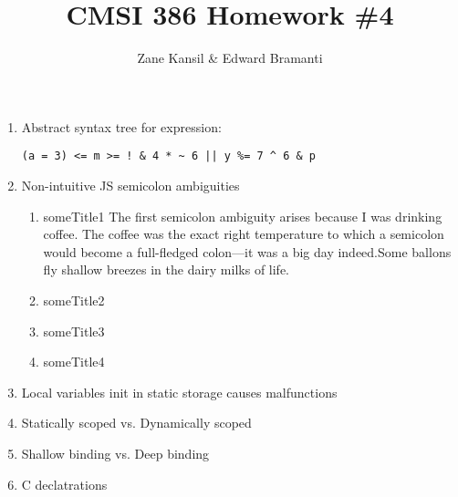 \documentclass{article}
\title{CMSI 386 Homework \#4}
\author{Zane Kansil \& Edward Bramanti}
\begin{document}
\maketitle
\begin{enumerate}
\item Abstract syntax tree for expression: 
\begin{verbatim}
(a = 3) <= m >= ! & 4 * ~ 6 || y %= 7 ^ 6 & p
\end{verbatim}
\item Non-intuitive JS semicolon ambiguities
\begin{enumerate}
    \item someTitle1 The first semicolon ambiguity arises because I was drinking coffee. The coffee was the exact right temperature to which a semicolon would become a full-fledged colon---it was a big day indeed.Some ballons fly shallow breezes in the dairy milks of life.
    \item someTitle2
    \item someTitle3
    \item someTitle4
\end{enumerate}
\item Local variables init in static storage causes malfunctions
\item Statically scoped vs. Dynamically scoped
\item Shallow binding vs. Deep binding
\item C declatrations

\end{enumerate}
\end{document}
